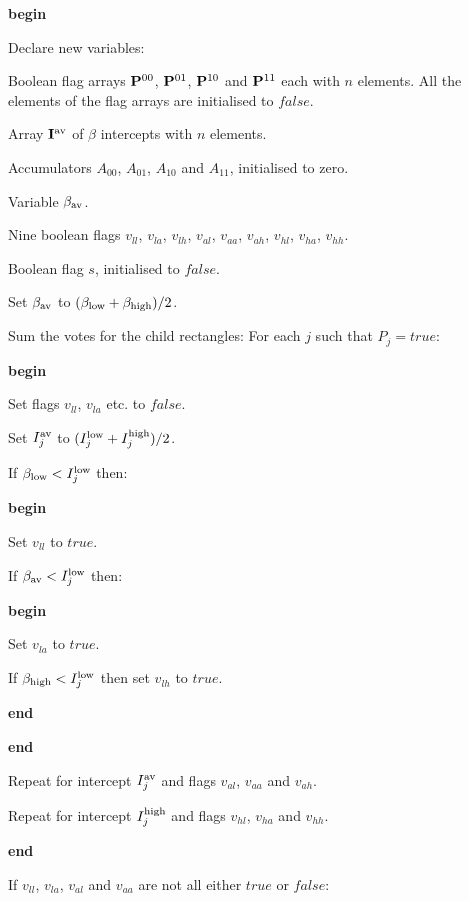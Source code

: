   {\bf begin}
  \begin{indent_para}
   Declare new variables:
   \begin{indent_para}
    Boolean flag arrays ${\bf P}^{00}$, ${\bf P}^{01}$, ${\bf P}^{10}$
    and ${\bf P}^{11}$ each with $n$ elements.
    All the elements of the flag arrays are initialised to $false$.

    Array ${\bf I}^{\rm av}$ of $\beta$ intercepts with $n$ elements.

    Accumulators $A_{00}$, $A_{01}$, $A_{10}$ and $A_{11}$, initialised
    to zero.

    Variable $\beta_{\rm av}$.

    Nine boolean flags $v_{ll}$, $v_{la}$, $v_{lh}$, $v_{al}$, $v_{aa}$,
    $v_{ah}$, $v_{hl}$, $v_{ha}$, $v_{hh}$.

    Boolean flag $s$, initialised to $false$.
   \end{indent_para}
   Set $\beta_{\rm av}$ to $(\beta_{\rm low} + \beta_{\rm high})/2$.

   Sum the votes for the child rectangles: For each $j$ such that $P_j = true$:

   {\bf begin}
   \begin{indent_para}
    Set flags $v_{ll}$, $v_{la}$ etc. to $false$.

    Set $I^{\rm av}_j$ to $(I^{\rm low}_j + I^{\rm high}_j)/2$.

    If $\beta_{\rm low} < I^{\rm low}_j$ then:

    {\bf begin}
    \begin{indent_para}
     Set $v_{ll}$ to $true$.

     If $\beta_{\rm av} < I^{\rm low}_j$ then:

     {\bf begin}
     \begin{indent_para}
      Set $v_{la}$ to $true$.

      If $\beta_{\rm high} < I^{\rm low}_j$ then set $v_{lh}$ to $true$.
     \end{indent_para}
     {\bf end}
    \end{indent_para}
    {\bf end}

    Repeat for intercept $I^{\rm av}_j$ and flags
    $v_{al}$, $v_{aa}$ and $v_{ah}$.

    Repeat for intercept $I^{\rm high}_j$ and flags
    $v_{hl}$, $v_{ha}$ and $v_{hh}$.
   \end{indent_para}
   {\bf end}

   If $v_{ll}$, $v_{la}$, $v_{al}$ and $v_{aa}$ are not all either $true$ or
   $false$:


\end{indent_para}
